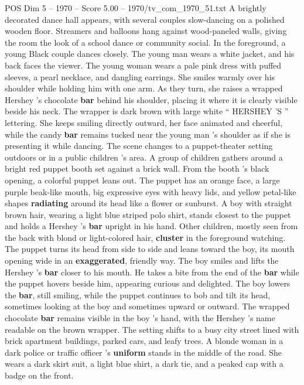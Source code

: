 \begin{textsample}{POS Dim 5 – 1970 – Score 5.00 – 1970/tv\_com\_1970\_51.txt}  \label{ex:f5_pos_088}
A brightly decorated dance hall appears, with several couples slow-dancing on a polished wooden floor.
Streamers and balloons hang against wood-paneled walls, giving the room the look of a school dance or community social.
In the foreground, a young Black couple dances closely.
The young man wears a white jacket, and his back faces the viewer.
The young woman wears a pale pink dress with puffed sleeves, a pearl necklace, and dangling earrings.
She smiles warmly over his shoulder while holding him with one arm.
As they turn, she raises a wrapped Hershey ’s chocolate \textbf{bar} behind his shoulder, placing it where it is clearly visible beside his neck.
The wrapper is dark brown with large white “ HERSHEY ’S ” lettering.
She keeps smiling directly outward, her face animated and cheerful, while the candy \textbf{bar} remains tucked near the young man ’s shoulder as if she is presenting it while dancing.
The scene changes to a puppet-theater setting outdoors or in a public children ’s area.
A group of children gathers around a bright red puppet booth set against a brick wall.
From the booth ’s black opening, a colorful puppet leans out.
The puppet has an orange face, a large purple beak-like mouth, big expressive eyes with heavy lids, and yellow petal-like shapes \textbf{radiating} around its head like a flower or sunburst.
A boy with straight brown hair, wearing a light blue striped polo shirt, stands closest to the puppet and holds a Hershey ’s \textbf{bar} upright in his hand.
Other children, mostly seen from the back with blond or light-colored hair, \textbf{cluster} in the foreground watching.
The puppet turns its head from side to side and leans toward the boy, its mouth opening wide in an \textbf{exaggerated}, friendly way.
The boy smiles and lifts the Hershey ’s \textbf{bar} closer to his mouth.
He takes a bite from the end of the \textbf{bar} while the puppet hovers beside him, appearing curious and delighted.
The boy lowers the \textbf{bar}, still smiling, while the puppet continues to bob and tilt its head, sometimes looking at the boy and sometimes upward or outward.
The wrapped chocolate \textbf{bar} remains visible in the boy ’s hand, with the Hershey ’s name readable on the brown wrapper.
The setting shifts to a busy city street lined with brick apartment buildings, parked cars, and leafy trees.
A blonde woman in a dark police or traffic officer ’s \textbf{uniform} stands in the middle of the road.
She wears a dark skirt suit, a light blue shirt, a dark tie, and a peaked cap with a badge on the front.

\end{textsample}
